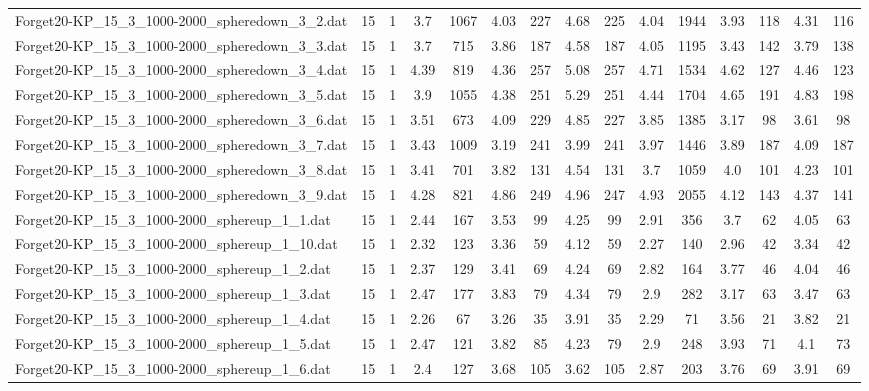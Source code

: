 \begin{table}[!ht]
{\begin{tabular}{lcccccccccccccc}
Forget20-KP\_15\_3\_1000-2000\_spheredown\_3\_2.dat & 15 & 1 & 3.7 & 1067 & 4.03 & 227 & 4.68 & 225 & 4.04 & 1944 & 3.93 & 118 & 4.31 & 116 \\
Forget20-KP\_15\_3\_1000-2000\_spheredown\_3\_3.dat & 15 & 1 & 3.7 & 715 & 3.86 & 187 & 4.58 & 187 & 4.05 & 1195 & 3.43 & 142 & 3.79 & 138 \\
Forget20-KP\_15\_3\_1000-2000\_spheredown\_3\_4.dat & 15 & 1 & 4.39 & 819 & 4.36 & 257 & 5.08 & 257 & 4.71 & 1534 & 4.62 & 127 & 4.46 & 123 \\
Forget20-KP\_15\_3\_1000-2000\_spheredown\_3\_5.dat & 15 & 1 & 3.9 & 1055 & 4.38 & 251 & 5.29 & 251 & 4.44 & 1704 & 4.65 & 191 & 4.83 & 198 \\
Forget20-KP\_15\_3\_1000-2000\_spheredown\_3\_6.dat & 15 & 1 & 3.51 & 673 & 4.09 & 229 & 4.85 & 227 & 3.85 & 1385 & 3.17 & 98 & 3.61 & 98 \\
Forget20-KP\_15\_3\_1000-2000\_spheredown\_3\_7.dat & 15 & 1 & 3.43 & 1009 & 3.19 & 241 & 3.99 & 241 & 3.97 & 1446 & 3.89 & 187 & 4.09 & 187 \\
Forget20-KP\_15\_3\_1000-2000\_spheredown\_3\_8.dat & 15 & 1 & 3.41 & 701 & 3.82 & 131 & 4.54 & 131 & 3.7 & 1059 & 4.0 & 101 & 4.23 & 101 \\
Forget20-KP\_15\_3\_1000-2000\_spheredown\_3\_9.dat & 15 & 1 & 4.28 & 821 & 4.86 & 249 & 4.96 & 247 & 4.93 & 2055 & 4.12 & 143 & 4.37 & 141 \\
Forget20-KP\_15\_3\_1000-2000\_sphereup\_1\_1.dat & 15 & 1 & 2.44 & 167 & 3.53 & 99 & 4.25 & 99 & 2.91 & 356 & 3.7 & 62 & 4.05 & 63 \\
Forget20-KP\_15\_3\_1000-2000\_sphereup\_1\_10.dat & 15 & 1 & 2.32 & 123 & 3.36 & 59 & 4.12 & 59 & 2.27 & 140 & 2.96 & 42 & 3.34 & 42 \\
Forget20-KP\_15\_3\_1000-2000\_sphereup\_1\_2.dat & 15 & 1 & 2.37 & 129 & 3.41 & 69 & 4.24 & 69 & 2.82 & 164 & 3.77 & 46 & 4.04 & 46 \\
Forget20-KP\_15\_3\_1000-2000\_sphereup\_1\_3.dat & 15 & 1 & 2.47 & 177 & 3.83 & 79 & 4.34 & 79 & 2.9 & 282 & 3.17 & 63 & 3.47 & 63 \\
Forget20-KP\_15\_3\_1000-2000\_sphereup\_1\_4.dat & 15 & 1 & 2.26 & 67 & 3.26 & 35 & 3.91 & 35 & 2.29 & 71 & 3.56 & 21 & 3.82 & 21 \\
Forget20-KP\_15\_3\_1000-2000\_sphereup\_1\_5.dat & 15 & 1 & 2.47 & 121 & 3.82 & 85 & 4.23 & 79 & 2.9 & 248 & 3.93 & 71 & 4.1 & 73 \\
Forget20-KP\_15\_3\_1000-2000\_sphereup\_1\_6.dat & 15 & 1 & 2.4 & 127 & 3.68 & 105 & 3.62 & 105 & 2.87 & 203 & 3.76 & 69 & 3.91 & 69 \\

\end{tabular}}
\end{table}
